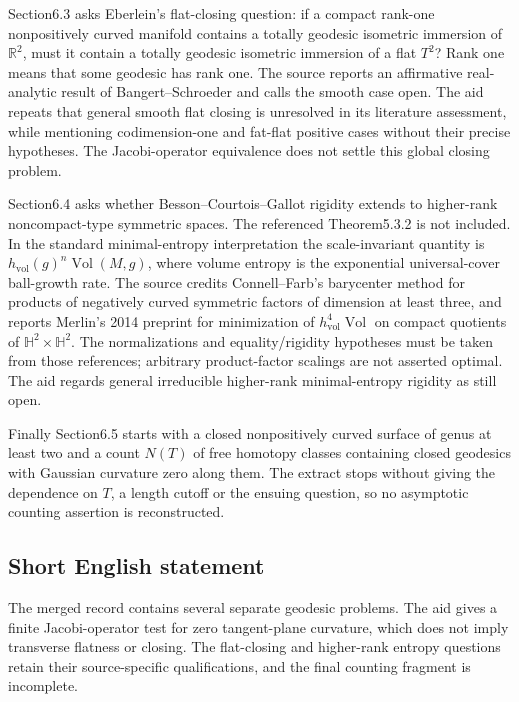 \documentclass[11pt]{article}
\newcommand{\R}{\mathbb{R}}
\begin{document}
Section6.3 asks Eberlein's flat-closing question: if a compact rank-one nonpositively curved manifold contains a totally geodesic isometric immersion of \(\R^2\), must it contain a totally geodesic isometric immersion of a flat \(T^2\)? Rank one means that some geodesic has rank one. The source reports an affirmative real-analytic result of Bangert--Schroeder and calls the smooth case open. The aid repeats that general smooth flat closing is unresolved in its literature assessment, while mentioning codimension-one and fat-flat positive cases without their precise hypotheses. The Jacobi-operator equivalence does not settle this global closing problem.

Section6.4 asks whether Besson--Courtois--Gallot rigidity extends to higher-rank noncompact-type symmetric spaces. The referenced Theorem5.3.2 is not included. In the standard minimal-entropy interpretation the scale-invariant quantity is \(h_{\mathrm{vol}}(g)^n\operatorname{Vol}(M,g)\), where volume entropy is the exponential universal-cover ball-growth rate. The source credits Connell--Farb's barycenter method for products of negatively curved symmetric factors of dimension at least three, and reports Merlin's 2014 preprint for minimization of \(h_{\mathrm{vol}}^4\operatorname{Vol}\) on compact quotients of \(\mathbb H^2\times\mathbb H^2\). The normalizations and equality/rigidity hypotheses must be taken from those references; arbitrary product-factor scalings are not asserted optimal. The aid regards general irreducible higher-rank minimal-entropy rigidity as still open.

Finally Section6.5 starts with a closed nonpositively curved surface of genus at least two and a count \(N(T)\) of free homotopy classes containing closed geodesics with Gaussian curvature zero along them. The extract stops without giving the dependence on \(T\), a length cutoff or the ensuing question, so no asymptotic counting assertion is reconstructed.
\subsection{Short English statement}
The merged record contains several separate geodesic problems. The aid gives a finite Jacobi-operator test for zero tangent-plane curvature, which does not imply transverse flatness or closing. The flat-closing and higher-rank entropy questions retain their source-specific qualifications, and the final counting fragment is incomplete.
\end{document}
